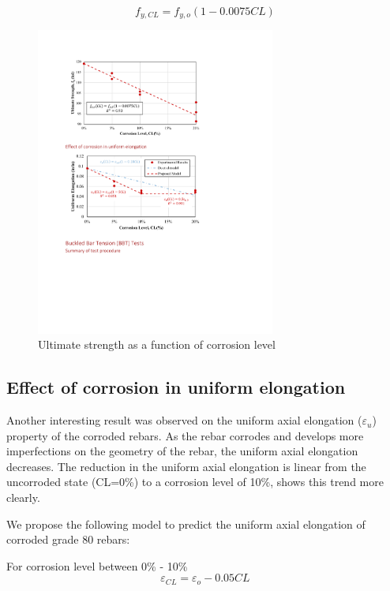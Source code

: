 \begin{equation}
    f_{y,CL} = f_{y,o}(1-0.0075CL)
    \label{eq.Calderon_Fu_vs_CL}
\end{equation}

\begin{figure}[htbp]
	\centering
	\includegraphics[width=0.7\textwidth]{VAC Thesis 2.0/Chapter-4/figs/TensionTest_results_5_UltimateStrength.pdf}
	\caption{Ultimate strength as a function of corrosion level}
	\label{fig:Calderon_ultimate_strength}
\end{figure}

\subsection{Effect of corrosion in uniform elongation}

Another interesting result was observed on the uniform axial elongation ($\varepsilon_{u}$) property of the corroded rebars. As the rebar corrodes and develops more imperfections on the geometry of the rebar, the uniform axial elongation decreases. The reduction in the uniform axial elongation is linear from the uncorroded state  (CL=0\%) to a corrosion level of 10\%,  shows this trend more clearly. 

We propose the following model to predict the uniform axial elongation of corroded grade 80 rebars:

For corrosion level between 0\% - 10\%
\begin{equation}
    \varepsilon_{CL} = \varepsilon_{o}-0.05CL
    \label{eq.Calderon_UAE_vs_CL}
\end{equation}

